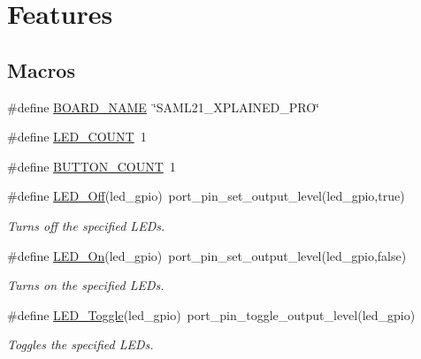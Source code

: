 \hypertarget{group__saml21__xplained__pro__features__group}{}\section{Features}
\label{group__saml21__xplained__pro__features__group}
\subsection*{Macros}
\begin{DoxyCompactItemize}
\item 
\#define \hyperlink{group__saml21__xplained__pro__features__group_ga02581754b212d533d96cde56c8145c9b}{B\+O\+A\+R\+D\+\_\+\+N\+A\+M\+E}~\char`\"{}S\+A\+M\+L21\+\_\+\+X\+P\+L\+A\+I\+N\+E\+D\+\_\+\+P\+R\+O\char`\"{}
\item 
\#define \hyperlink{group__saml21__xplained__pro__features__group_gad698e2cb680601529f08c3e5f2b0cebb}{L\+E\+D\+\_\+\+C\+O\+U\+N\+T}~1
\item 
\#define \hyperlink{group__saml21__xplained__pro__features__group_ga687f94d4d3be4db86a833082ecdf980a}{B\+U\+T\+T\+O\+N\+\_\+\+C\+O\+U\+N\+T}~1
\item 
\#define \hyperlink{group__saml21__xplained__pro__features__group_ga4b0995a1d0a6a7bcbaf9f4096cc633c7}{L\+E\+D\+\_\+\+Off}(led\+\_\+gpio)~port\+\_\+pin\+\_\+set\+\_\+output\+\_\+level(led\+\_\+gpio,true)
\begin{DoxyCompactList}\small\item\em Turns off the specified L\+E\+Ds. \end{DoxyCompactList}\item 
\#define \hyperlink{group__saml21__xplained__pro__features__group_ga589335327be57d2761bfa96c55d62f29}{L\+E\+D\+\_\+\+On}(led\+\_\+gpio)~port\+\_\+pin\+\_\+set\+\_\+output\+\_\+level(led\+\_\+gpio,false)
\begin{DoxyCompactList}\small\item\em Turns on the specified L\+E\+Ds. \end{DoxyCompactList}\item 
\#define \hyperlink{group__saml21__xplained__pro__features__group_gac66f7ba408e0f06c78db8b3048126c8e}{L\+E\+D\+\_\+\+Toggle}(led\+\_\+gpio)~port\+\_\+pin\+\_\+toggle\+\_\+output\+\_\+level(led\+\_\+gpio)
\begin{DoxyCompactList}\small\item\em Toggles the specified L\+E\+Ds. \end{DoxyCompactList}\end{DoxyCompactItemize}

